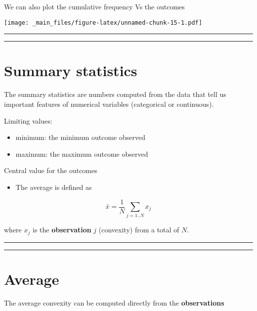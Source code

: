 \documentclass[
]{book}
\providecommand{\tightlist}{%
  \setlength{\itemsep}{0pt}\setlength{\parskip}{0pt}}
\begin{document}
We can also plot the cumulative frequency Vs the outcomes

\texttt{[image: \_main\_files/figure-latex/unnamed-chunk-15-1.pdf]}

\begin{center}\rule{0.5\linewidth}{0.5pt}\end{center}

\begin{center}\rule{0.5\linewidth}{0.5pt}\end{center}

\hypertarget{summary-statistics}{%
\section{Summary statistics}\label{summary-statistics}}

The summary statistics are numbers computed from the data that tell us important features of numerical variables (categorical or continuous).

Limiting values:

\begin{itemize}
\tightlist
\item
  minimum: the minimum outcome observed
\item
  maximum: the maximum outcome observed
\end{itemize}

Central value for the outcomes

\begin{itemize}
\tightlist
\item
  The average is defined as
\end{itemize}

\[\bar{x}=\frac{1}{N} \sum_{j=1..N} x_j\]

where \(x_j\) is the \textbf{observation} \(j\) (convexity) from a total of \(N\).

\begin{center}\rule{0.5\linewidth}{0.5pt}\end{center}

\begin{center}\rule{0.5\linewidth}{0.5pt}\end{center}

\hypertarget{average}{%
\section{Average}\label{average}}

The average convexity can be computed directly from the \textbf{observations}
\end{document}
